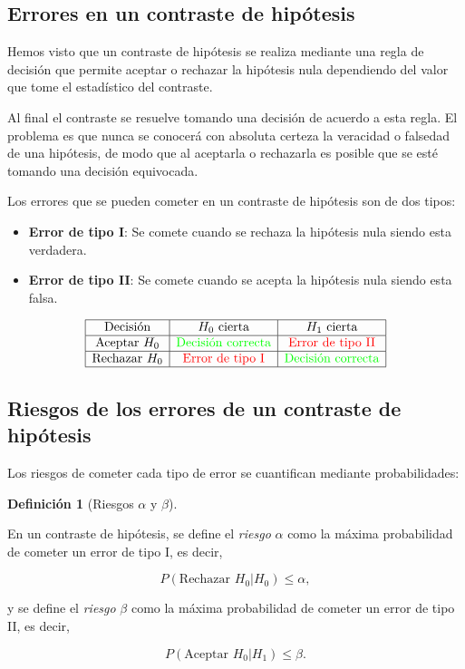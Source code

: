 \documentclass[
  spanish,
  a4paper,
]{scrreport}
\theoremstyle{plain}
\theoremstyle{definition}
\theoremstyle{definition}
\newtheorem{definition}{Definición}[chapter]
\theoremstyle{remark}
\begin{document}
\subsection{Errores en un contraste de
hipótesis}\label{errores-en-un-contraste-de-hipuxf3tesis}

Hemos visto que un contraste de hipótesis se realiza mediante una regla
de decisión que permite aceptar o rechazar la hipótesis nula dependiendo
del valor que tome el estadístico del contraste.

Al final el contraste se resuelve tomando una decisión de acuerdo a esta
regla. El problema es que nunca se conocerá con absoluta certeza la
veracidad o falsedad de una hipótesis, de modo que al aceptarla o
rechazarla es posible que se esté tomando una decisión equivocada.

Los errores que se pueden cometer en un contraste de hipótesis son de
dos tipos:

\begin{itemize}
\item
  \textbf{Error de tipo I}: Se comete cuando se rechaza la hipótesis
  nula siendo esta verdadera.
\item
  \textbf{Error de tipo II}: Se comete cuando se acepta la hipótesis
  nula siendo esta falsa.
\end{itemize}

\[
\begin{array}{|c|c|c|}
\hline
\mbox{Decisión} & H_0 \mbox{ cierta} & H_1 \mbox{ cierta} \\
\hline
\mbox{Aceptar } H_0 & \color{green}{\mbox{Decisión correcta}} & \color{red}{\mbox{Error de tipo II}} \\
\hline
\mbox{Rechazar }H_0 & \color{red}{\mbox{Error de tipo I}} & \color{green}{\mbox{Decisión correcta}} \\
\hline
\end{array}
\]

\subsection{Riesgos de los errores de un contraste de
hipótesis}\label{riesgos-de-los-errores-de-un-contraste-de-hipuxf3tesis}

Los riesgos de cometer cada tipo de error se cuantifican mediante
probabilidades:

\begin{definition}[Riesgos \(\alpha\) y
\(\beta\)]\protect\hypertarget{def-riesgos-alfa-beta}{}\label{def-riesgos-alfa-beta}

En un contraste de hipótesis, se define el \emph{riesgo} \(\alpha\) como
la máxima probabilidad de cometer un error de tipo I, es decir,

\[
P(\mbox{Rechazar }H_0|H_0) \leq \alpha,
\]

y se define el \emph{riesgo} \(\beta\) como la máxima probabilidad de
cometer un error de tipo II, es decir,

\[
P(\mbox{Aceptar }H_0|H_1) \leq \beta.
\]

\end{definition}
\end{document}
